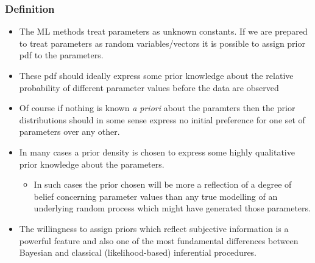 \documentclass[12pt]{article}
\begin{document}
\subsubsection{Definition}
\begin{itemize}
    \item The ML methods treat parameters as unknown constants. If we are prepared to treat parameters as random variables/vectors it is possible to assign prior pdf to the parameters.
    \item These pdf should ideally express some prior knowledge about the relative probability of different parameter values before the data are observed
    \item Of course if nothing is known \textit{a priori} about the paramters then the prior distributions should in some sense express no initial preference for one set of parameters over any other.
    \item In many cases a prior density is chosen to express some highly qualitative prior knowledge about the parameters.
    \begin{itemize}
        \item In such cases the prior chosen will be more a reflection of a degree of belief concerning parameter values than any true modelling of an underlying random process which might have generated those parameters.
    \end{itemize}
    \item The willingness to assign priors which reflect subjective information is a powerful feature and also one of the most fundamental differences between Bayesian and classical (likelihood-based) inferential procedures.
\end{itemize}
\end{document}
